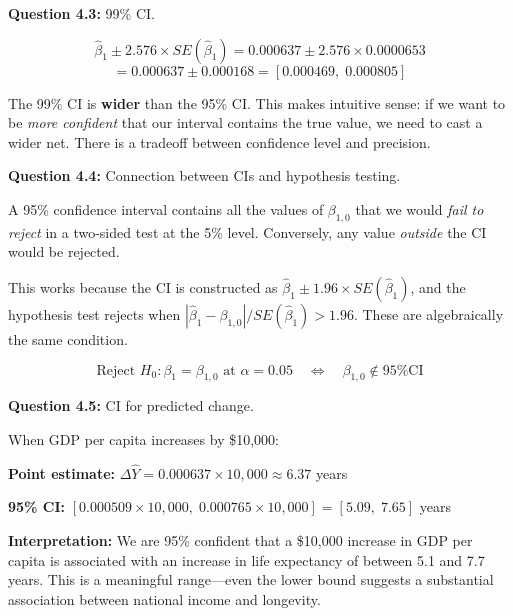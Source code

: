 \documentclass[11pt,letterpaper]{article}
\begin{document}
\textbf{Question 4.3:} 99\% CI.

\begin{answer}
\[
\hat{\beta}_1 \pm 2.576 \times SE(\hat{\beta}_1) = 0.000637 \pm 2.576 \times 0.0000653
\]
\[
= 0.000637 \pm 0.000168 = [0.000469,\; 0.000805]
\]

The 99\% CI is \textbf{wider} than the 95\% CI. This makes intuitive sense: if we want to be \textit{more confident} that our interval contains the true value, we need to cast a wider net. There is a tradeoff between confidence level and precision.
\end{answer}

\textbf{Question 4.4:} Connection between CIs and hypothesis testing.

\begin{answer}
A 95\% confidence interval contains all the values of $\beta_{1,0}$ that we would \textit{fail to reject} in a two-sided test at the 5\% level. Conversely, any value \textit{outside} the CI would be rejected.

This works because the CI is constructed as $\hat{\beta}_1 \pm 1.96 \times SE(\hat{\beta}_1)$, and the hypothesis test rejects when $|\hat{\beta}_1 - \beta_{1,0}| / SE(\hat{\beta}_1) > 1.96$. These are algebraically the same condition.

\[
\boxed{\text{Reject } H_0: \beta_1 = \beta_{1,0} \text{ at } \alpha = 0.05 \quad \Longleftrightarrow \quad \beta_{1,0} \notin \text{95\% CI}}
\]
\end{answer}

\textbf{Question 4.5:} CI for predicted change.

\begin{answer}
When GDP per capita increases by \$10,000:

\textbf{Point estimate:} $\Delta \hat{Y} = 0.000637 \times 10{,}000 \approx 6.37$ years

\textbf{95\% CI:} $[0.000509 \times 10{,}000,\; 0.000765 \times 10{,}000] = [5.09,\; 7.65]$ years

\textbf{Interpretation:} We are 95\% confident that a \$10,000 increase in GDP per capita is associated with an increase in life expectancy of between 5.1 and 7.7 years. This is a meaningful range---even the lower bound suggests a substantial association between national income and longevity.
\end{answer}

\newpage

\end{document}
